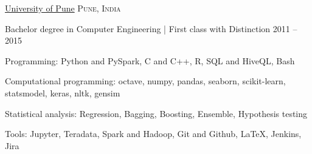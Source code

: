 \documentclass[10pt,a4paper]{article}
\begin{document}
\spacedhrule{0.9em}{-0.4em}




\headedsection
  {\href{}{University of Pune}}
  {\textsc{Pune, India}} {%
  \headedsubsection
    {Bachelor degree in Computer Engineering | First class with Distinction}
    {2011 -- 2015}

}

\spacedhrule{0.9em}{-0.4em}



\inlineheadsection  %
 {Programming:}
{Python and PySpark, C and C++, R, SQL and HiveQL, Bash}
\vspace{0.5em}

\inlineheadsection
 {Computational programming:}
{octave, numpy, pandas, seaborn, scikit-learn, statsmodel, keras, nltk, gensim}
\vspace{0.5em}

\inlineheadsection
 {Statistical analysis:}
{Regression, Bagging, Boosting, Ensemble, Hypothesis testing}
\vspace{0.5em}

\inlineheadsection
  {Tools:}
  {Jupyter, Teradata, Spark and Hadoop, Git and Github, \LaTeX, Jenkins, Jira}
\end{document}

